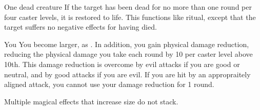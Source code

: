 \begin{spellheader}
\end{spellheader}
\begin{spelleffects}
    \begin{spelltarget}{One dead creature}
        \spelleffect If the target has been dead for no more than one round per four caster levels, it is restored to life. This functions like  ritual, except that the target suffers no negative effects for having died.
    \end{spelltarget}
    \spellline
\end{spelleffects}
\begin{spellfooter}
    
\end{spellfooter}

\begin{spellheader}
    \spelldur{\durshort \dismissable}
\end{spellheader}
\begin{spelleffects}
    \begin{spelltarget}{You}
        \spellsuccess You become larger, as . In addition, you gain physical damage reduction, reducing the physical damage you take each round by 10  per caster level above 10th. This damage reduction is overcome by evil attacks if you are good or neutral, and by good attacks if you are evil. If you are hit by an appropraitely aligned attack, you cannot use your damage reduction for 1 round.
    \end{spelltarget}
\end{spelleffects}
\begin{spellfooter}
    \spellnotes Multiple magical effects that increase size do not stack.
\end{spellfooter}

\begin{comment}
\subsubsection{S}
\end{comment}

